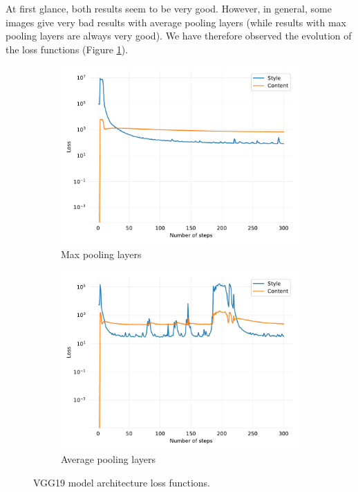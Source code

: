 \documentclass[twocolumn,superscriptaddress,aps, floatfix]{revtex4-1}
\begin{document}
    At first glance, both results seem to be very good. However, in general, some images give very bad results with average pooling layers (while results with max pooling layers are always very good). We have therefore observed the evolution of the loss functions (Figure \ref{fig:model.architecture.loss}).
    
    \begin{figure}[ht]
        \centering
        \begin{subfigure}[b]{0.22\textwidth}
            \centering
            \includegraphics[width=\textwidth]{resources/pdf/architecture/sun-trees-paris-maxpool.pdf}
            \caption{Max pooling layers}
        \end{subfigure}
        \hfill
        \begin{subfigure}[b]{0.22\textwidth}
            \centering
            \includegraphics[width=\textwidth]{resources/pdf/architecture/sun-trees-paris-avgpool.pdf}
            \caption{Average pooling layers}
        \end{subfigure}
        \caption{VGG19 model architecture loss functions.}
        \label{fig:model.architecture.loss}
    \end{figure}
    
\end{document}
